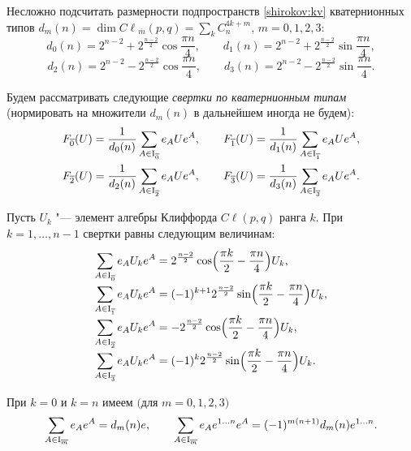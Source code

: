 \smallskip

Несложно подсчитать размерности подпространств \eqref{shirokov:kv} кватернионных типов 
$d_m(n)=\dim{{C}\!\ell}_{\overline m}(p,q)=\sum_k C_n^{4k+m}$, $m=0, 1, 2, 3$:
$$d_0(n)=2^{n-2}+2^{\frac{n-2}{2}}\cos{\frac{\pi n}{4}},\qquad d_1(n)=2^{n-2}+2^{\frac{n-2}{2}}\sin{\frac{\pi n}{4}},$$
$$d_2(n)=2^{n-2}-2^{\frac{n-2}{2}}\cos{\frac{\pi n}{4}},\qquad d_3(n)=2^{n-2}-2^{\frac{n-2}{2}}\sin{\frac{\pi n}{4}}.$$

Будем рассматривать следующие {\it свертки по кватернионным типам} (нормировать на множители $d_m(n)$ в дальнейшем иногда не будем):
\begin{gather}
F_{\overline 0}(U)=\frac{1}{d_0(n)}\sum_{A\in{\rm I}_ {\overline 0}} e_A U e^A,\qquad F_{\overline 1}(U)=\frac{1}{d_1(n)}\sum_{A\in{\rm I}_ {\overline 1}} e_A U e^A,\label{shirokov:svkvat}\\
F_{\overline 2}(U)=\frac{1}{d_2(n)}\sum_{A\in{\rm I}_ {\overline 2}} e_A U e^A,\qquad F_{\overline 3}(U)=\frac{1}{d_3(n)}\sum_{A\in{\rm I}_ {\overline 3}} e_A U e^A.\nonumber
\end{gather}

\smallskip

\hypertarget{shirokov:theoremSvKvat}{}
\begin{theorem}[8]Пусть $U_k$ "--- элемент алгебры Клиффорда ${{C}\!\ell}(p,q)$ ранга $k.$ 
При $k=1, \ldots, n-1$ свертки равны следующим величинам:
\begin{equation}
\begin{array}{l}
\displaystyle
\sum_{A\in{\rm I}_ {\overline 0}} e_A U_k e^A=2^{\frac{n-2}{2}}\cos\Bigl(\frac{\pi k}{2}-\frac{\pi n}{4}\Bigr)U_k,\\[2mm]
\displaystyle
\sum_{A\in{\rm I}_ {\overline 1}} e_A U_k e^A=(-1)^{k+1}2^{\frac{n-2}{2}}\sin\Bigl(\frac{\pi k}{2}-\frac{\pi n}{4}\Bigr)U_k,\\[2mm]
\displaystyle
\sum_{A\in{\rm I}_ {\overline 2}} e_A U_k e^A=-2^{\frac{n-2}{2}}\cos\Bigl(\frac{\pi k}{2}-\frac{\pi n}{4}\Bigr)U_k,\\[2mm]
\displaystyle
\sum_{A\in{\rm I}_ {\overline 3}} e_A U_k e^A=(-1)^{k}2^{\frac{n-2}{2}}\sin\Bigl(\frac{\pi k}{2}-\frac{\pi n}{4}\Bigr)U_k.
\end{array}
\label{shirokov:svkv}
\end{equation}

При $k=0$ и $k=n$ имеем $($для $m=0, 1, 2, 3)$
\begin{equation} 
\sum_{A\in{\rm I}_ {\overline m}} e_A  e^A=d_m(n)e,\qquad \sum_{A\in{\rm I}_ {\overline m}} e_A e^{1\ldots n} e^A=(-1)^{m(n+1)} d_m(n)e^{1\ldots n}.
\label{shirokov:svkv2}
\end{equation}
\end{theorem}

